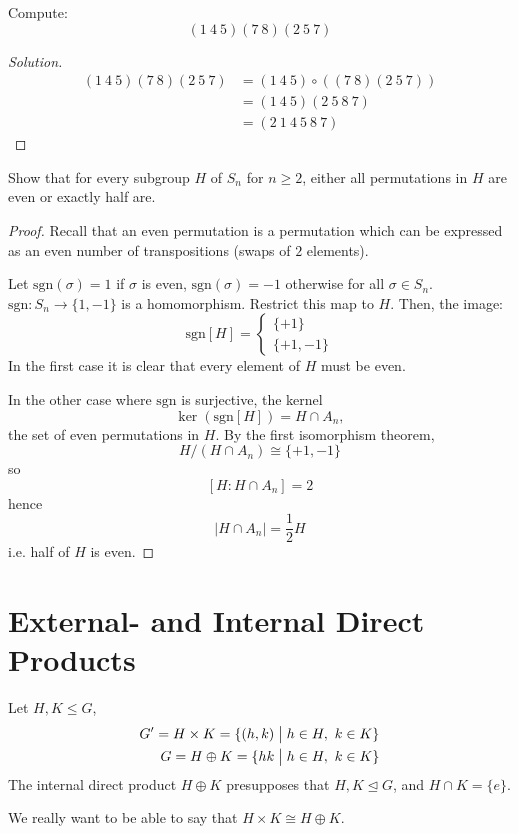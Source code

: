 \begin{prob}
    Compute: 
    \[
        (1 \ 4 \ 5)(7 \ 8)(2 \ 5 \ 7)
    \]
\end{prob}
\begin{proof}[Solution]
    \begin{align*}
        (1 \ 4 \ 5)(7 \ 8)(2 \ 5 \ 7)
        &= (1 \ 4 \ 5) \circ ((7 \ 8)(2 \ 5 \ 7)) \\ 
        &= (1 \ 4 \ 5) (2 \ 5 \ 8 \ 7) \\ 
        &= (2 \ 1 \ 4 \ 5 \ 8 \ 7)
    \end{align*}
\end{proof}
\begin{prob}
    Show that for every subgroup $H$ of $S_n$ for $n \geq 2$, 
    either all permutations in $H$ are even or exactly half are. 
\end{prob}
\begin{proof}
    Recall that an even permutation is a permutation which can be 
    expressed as an even number of transpositions (swaps of 
    $2$ elements). 

    Let $\text{sgn}(\sigma) = 1$ if $\sigma$ is even, 
    $\text{sgn}(\sigma) = -1$ otherwise for all $\sigma \in S_n$.  
    $\text{sgn}:S_n \to \{1,-1\}$ is a homomorphism.  
    Restrict this map to $H$. Then, the image: 
    \[
        \text{sgn}[H] = 
        \begin{cases}
            \{+1\} \\ 
            \{+1,-1\}
        \end{cases}
    \]
    In the first case it is clear that every element of $H$ must 
    be even. 

    In the other case where $\text{sgn}$ is surjective, the 
    kernel 
    \[
        \ker(\text{sgn}[H]) = H \cap A_n,
    \]
    the set of even permutations in $H$. 
    By the first isomorphism theorem, 
    \[
        H/(H\cap A_n) \cong \{+1, -1\}
    \]
    so 
    \[
        [H:H\cap A_n] = 2
    \]
    hence 
    \[
        |H \cap A_n| = \frac{1}{2} H
    \]
    i.e. half of $H$ is even. 
\end{proof}

\newpage 
\section{External- and Internal Direct Products}
\begin{defn}
    Let $H,K \leq G$, 
    \begin{align*}
        G' = H \times K = \{(h,k) \bigm| h \in H, \ k \in K\} \\ 
        G = H \oplus K = \{hk \bigm| h \in H, \ k \in K\}
    \end{align*}
    The internal direct product $H \oplus K$ presupposes that 
    $H, K \unlhd G$, and $H \cap K = \{e\}$.
\end{defn}
We really want to be able to say that $H \times K \cong H \oplus K$.

